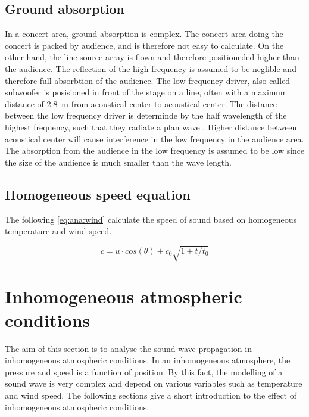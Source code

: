 \subsection{Ground absorption} 
In a concert area, ground absorption is complex. The concert area doing the concert is packed by audience, and is therefore not easy to calculate. On the other hand, the line source array is flown and therefore positioneded higher than the audience. The reflection of the high frequency is assumed to be neglible and therefore full absorbtion of the audience. The low frequency driver, also called subwoofer is posisioned in front of the stage on a line, often with a maximum distance of \SI{2.8}{\meter} from acoustical center to acoustical center. The distance between the low frequency driver is determinde by the half wavelength of the highest frequency, such that they radiate a plan wave \citep{bauman2001wavefront}. Higher distance between acoustical center will cause interference in the low frequency in the audience area. The absorption from the audience in the low frequency is assumed to be low since the size of the audience is much smaller than the wave length.   


 
 \subsection{Homogeneous speed equation}\label{sec:ana:inhom_ats_con}
 The following \autoref{eq:ana:wind} calculate the speed of sound based on homogeneous temperature and wind speed.

\begin{equation}\label{eq:ana:wind}
c = u \cdot cos(\theta) + c_0 \sqrt{1+t/t_0}
\end{equation}  

\startexplain
{}
\stopexplain


 
\section{Inhomogeneous atmospheric conditions} 
The aim of this section is to analyse the sound wave propagation in inhomogeneous atmospheric conditions. In an inhomogeneous atmosphere, the pressure and speed is a function of position. By this fact, the modelling of a sound wave is very complex and depend on various variables such as temperature and wind speed. The following sections give a short introduction to the effect of inhomogeneous atmospheric conditions. 
 
